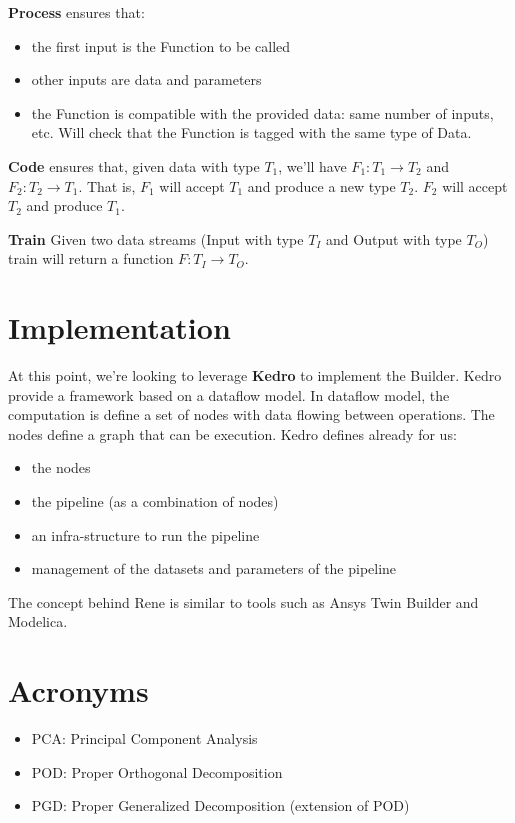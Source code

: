 \documentclass[a4paper,12pt]{article}
\begin{document}
\textbf{Process} ensures that:
\begin{itemize}
  \item the first input is the Function to be called
  \item other inputs are data and parameters
  \item the Function is compatible with the provided data: same number of inputs, etc.
  Will check that the Function is tagged with the same type of Data.
\end{itemize}

\textbf{Code} ensures that, given data with type $T_1$, we'll have
$F_1: T_1 \rightarrow T_2$ and $F_2: T_2 \rightarrow T_1$. That is, $F_1$ will accept
$T_1$ and produce a new type $T_2$. $F_2$ will accept $T_2$ and produce $T_1$.

\textbf{Train} Given two data streams (Input with type $T_I$ and Output with type
$T_O$) train will return a function $F: T_I \rightarrow T_O$.

\section{Implementation}

At this point, we're looking to leverage \textbf{Kedro} to implement the
Builder. Kedro provide a framework based on a dataflow model. In dataflow model, the computation is
define a set of nodes with data flowing between operations. The nodes define a
graph that can be execution. Kedro defines already for us:
\begin{itemize}
  \item the nodes
  \item the pipeline (as a combination of nodes)
  \item an infra-structure to run the pipeline
  \item management of the datasets and parameters of the pipeline
\end{itemize}

The concept behind Rene is similar to tools such as Ansys Twin Builder and
Modelica.

\section{Acronyms}
\begin{itemize}
  \item PCA: Principal Component Analysis
  \item POD: Proper Orthogonal Decomposition
  \item PGD: Proper Generalized Decomposition (extension of POD)
\end{itemize}
\end{document}

